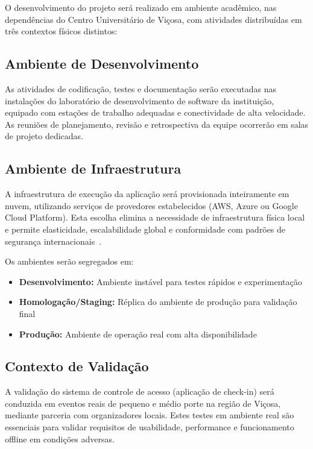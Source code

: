 O desenvolvimento do projeto será realizado em ambiente acadêmico, nas dependências do Centro Universitário de Viçosa, com atividades distribuídas em três contextos físicos distintos:

\subsection{Ambiente de Desenvolvimento}

As atividades de codificação, testes e documentação serão executadas nas instalações do laboratório de desenvolvimento de software da instituição, equipado com estações de trabalho adequadas e conectividade de alta velocidade. As reuniões de planejamento, revisão e retrospectiva da equipe ocorrerão em salas de projeto dedicadas.

\subsection{Ambiente de Infraestrutura}

A infraestrutura de execução da aplicação será provisionada inteiramente em nuvem, utilizando serviços de provedores estabelecidos (AWS, Azure ou Google Cloud Platform). Esta escolha elimina a necessidade de infraestrutura física local e permite elasticidade, escalabilidade global e conformidade com padrões de segurança internacionais~\cite{MellGrance:2011}.

Os ambientes serão segregados em:

\begin{itemize}
    \item \textbf{Desenvolvimento:} Ambiente instável para testes rápidos e experimentação
    \item \textbf{Homologação/Staging:} Réplica do ambiente de produção para validação final
    \item \textbf{Produção:} Ambiente de operação real com alta disponibilidade
\end{itemize}

\subsection{Contexto de Validação}

A validação do sistema de controle de acesso (aplicação de check-in) será conduzida em eventos reais de pequeno e médio porte na região de Viçosa, mediante parceria com organizadores locais. Estes testes em ambiente real são essenciais para validar requisitos de usabilidade, performance e funcionamento offline em condições adversas.


